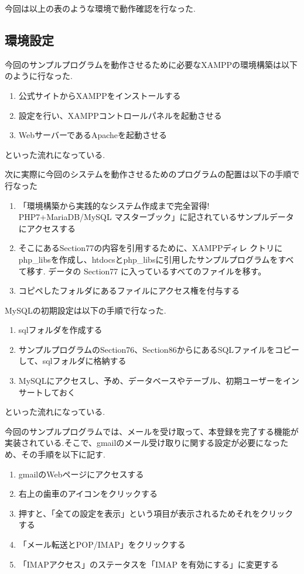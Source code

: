 \documentclass[submit,techrep]{ipsj}
\begin{document}
今回は以上の表のような環境で動作確認を行なった.

\subsection{環境設定}
今回のサンプルプログラムを動作させるために必要なXAMPPの環境構築は以下のように行なった.

\begin{enumerate}
  \item 公式サイトからXAMPPをインストールする
  \item 設定を行い、XAMPPコントロールパネルを起動させる
  \item  WebサーバーであるApacheを起動させる
  \end{enumerate}
といった流れになっている.

次に実際に今回のシステムを動作させるためのプログラムの配置は以下の手順で行なった

\begin{enumerate}
  \item 「環境構築から実践的なシステム作成まで完全習得! PHP7+MariaDB/MySQL マスターブック」に記されているサンプルデータにアクセスする
  \item そこにあるSection77の内容を引用するために、XAMPPディレ クトリにphp\_libsを作成し、htdocsとphp\_libsに引用したサンプルプログラムをすべて移す.
データの Section77 に入っているすべてのファイルを移す。
  \item  コピペしたフォルダにあるファイルにアクセス権を付与する
  \end{enumerate}
  
  
  MySQLの初期設定は以下の手順で行なった.
\begin{enumerate}
  \item sqlフォルダを作成する
  \item サンプルプログラムのSection76、Section86からにあるSQLファイルをコピーして、sqlフォルダに格納する
  \item MySQLにアクセスし、予め、データベースやテーブル、初期ユーザーをインサートしておく
  \end{enumerate}
といった流れになっている.

今回のサンプルプログラムでは、メールを受け取って、本登録を完了する機能が実装されている.そこで、gmailのメール受け取りに関する設定が必要になっため、その手順を以下に記す.


\begin{enumerate}
  \item gmailのWebページにアクセスする
  \item 右上の歯車のアイコンをクリックする
  \item 押すと、「全ての設定を表示」という項目が表示されるためそれをクリックする
  \item 「メール転送とPOP/IMAP」をクリックする
  \item 「IMAPアクセス」のステータスを「IMAP を有効にする」に変更する
  \end{enumerate}
  
\end{document}
